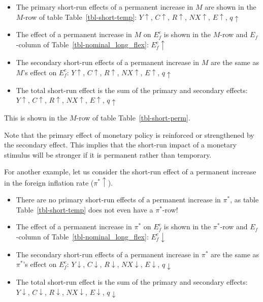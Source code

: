 \documentclass[
  letterpaper,
]{book}
\providecommand{\tightlist}{%
  \setlength{\itemsep}{0pt}\setlength{\parskip}{0pt}}\usepackage{longtable,booktabs,array}
\theoremstyle{plain}
\theoremstyle{remark}
\begin{document}
\begin{itemize}
\tightlist
\item
  The primary short-run effects of a permanent increase in \(M\) are
  shown in the \(M\)-row of table Table~\ref{tbl-short-temp}:
  \(Y\uparrow\), \(C\uparrow\), \(R\uparrow\), \(NX\uparrow\),
  \(E\uparrow\), \(q\uparrow\)
\item
  The effect of a permanent increase in \(M\) on \(E_f^e\) is shown in
  the \(M\)-row and \(E_f\)-column of Table~\ref{tbl-nominal_long_flex}:
  \(E_f^e\uparrow\)
\item
  The secondary short-run effects of a permanent increase in \(M\) are
  the same as \(M\)'s effect on \(E_f^e\): \(Y\uparrow\), \(C\uparrow\),
  \(R\uparrow\), \(NX\uparrow\), \(E\uparrow\), \(q\uparrow\)
\item
  The total short-run effect is the sum of the primary and secondary
  effects: \(Y\uparrow\), \(C\uparrow\), \(R\uparrow\), \(NX\uparrow\),
  \(E\uparrow\), \(q\uparrow\)
\end{itemize}

This is shown in the \(M\)-row of table Table~\ref{tbl-short-perm}.

Note that the primary effect of monetary policy is reinforced or
strengthened by the secondary effect. This implies that the short-run
impact of a monetary stimulus will be stronger if it is permanent rather
than temporary.

For another example, let us consider the short-run effect of a permanent
increase in the foreign inflation rate (\(\pi^*\uparrow\)).

\begin{itemize}
\tightlist
\item
  There are no primary short-run effects of a permanent increase in
  \(\pi^*\), as table Table~\ref{tbl-short-temp} does not even have a
  \(\pi^*\)-row!
\item
  The effect of a permanent increase in \(\pi^*\) on \(E_f^e\) is shown
  in the \(\pi^*\)-row and \(E_f\)-column of
  Table~\ref{tbl-nominal_long_flex}: \(E_f^e\downarrow\)
\item
  The secondary short-run effects of a permanent increase in \(\pi^*\)
  are the same as \(\pi^*\)'s effect on \(E_f^e\): \(Y\downarrow\),
  \(C\downarrow\), \(R\downarrow\), \(NX\downarrow\), \(E\downarrow\),
  \(q\downarrow\)
\item
  The total short-run effect is the sum of the primary and secondary
  effects: \(Y\downarrow\), \(C\downarrow\), \(R\downarrow\),
  \(NX\downarrow\), \(E\downarrow\), \(q\downarrow\)
\end{itemize}
\end{document}
